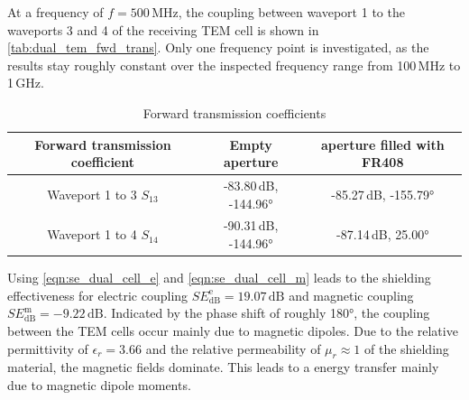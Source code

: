 At a frequency of $f=500\,\mathrm{MHz}$, the coupling between waveport 1 to the waveports 3 and 4 of the receiving TEM cell is shown in \autoref{tab:dual_tem_fwd_trans}. Only one frequency point is investigated, as the results stay roughly constant over the inspected frequency range from 100\,MHz to 1\,GHz. 


\begin{table}
    \centering
    \begin{tabular}{|c|c|c|}
        \hline
        Forward transmission coefficient & Empty aperture & aperture filled with FR408\\\hline\hline
        Waveport 1 to 3 $S_{13}$ & -83.80\,dB, -144.96° & -85.27\,dB, -155.79°\\\hline
        Waveport 1 to 4 $S_{14}$ & -90.31\,dB, -144.96° & -87.14\,dB, 25.00°\\\hline
    \end{tabular}
    \caption{Forward transmission coefficients}
    \label{tab:dual_tem_fwd_trans}
\end{table}

Using \autoref{eqn:se_dual_cell_e} and \autoref{eqn:se_dual_cell_m} leads to the shielding effectiveness for electric coupling $SE_\mathrm{dB}^\mathrm{e}=19.07\,\mathrm{dB}$ and magnetic coupling $SE_\mathrm{dB}^\mathrm{m}=-9.22\,\mathrm{dB}$.  Indicated by the phase shift of roughly 180°, the coupling between the TEM cells occur mainly due to magnetic dipoles. Due to the relative permittivity of $\epsilon _r=3.66$ and the relative permeability of $\mu_r\approx 1$ of the shielding material, the magnetic fields dominate. This leads to a energy transfer mainly due to magnetic dipole moments.
